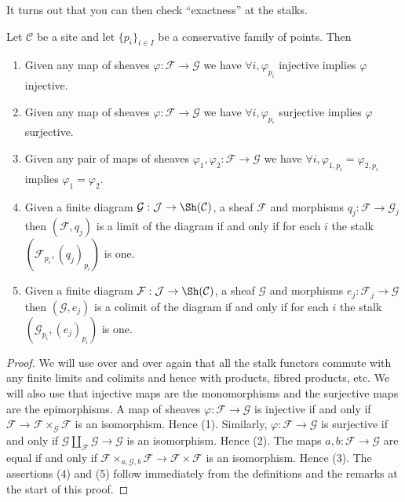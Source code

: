 \noindent
It turns out that you can then check ``exactness'' at the stalks.

\begin{lemma}
\label{lemma-exactness-stalks}
Let $\mathcal{C}$ be a site and let $\{p_i\}_{i\in I}$ be a conservative
family of points. Then
\begin{enumerate}
\item Given any map of sheaves $\varphi : \mathcal{F} \to \mathcal{G}$
we have $\forall i, \varphi_{p_i}$ injective implies $\varphi$ injective.
\item Given any map of sheaves $\varphi : \mathcal{F} \to \mathcal{G}$
we have $\forall i, \varphi_{p_i}$ surjective implies $\varphi$ surjective.
\item Given any pair of maps of sheaves
$\varphi_1, \varphi_2 : \mathcal{F} \to \mathcal{G}$
we have $\forall i, \varphi_{1, p_i} = \varphi_{2, p_i}$
implies $\varphi_1 = \varphi_2$.
\item Given a finite diagram $\mathcal{G} : \mathcal{J}
\to \Sh(\mathcal{C})$, a sheaf $\mathcal{F}$ and morphisms
$q_j : \mathcal{F} \to \mathcal{G}_j$ then $(\mathcal{F}, q_j)$
is a limit of the diagram if and only if for each $i$ the stalk
$(\mathcal{F}_{p_i}, (q_j)_{p_i})$ is one.
\item Given a finite diagram $\mathcal{F} : \mathcal{J}
\to \Sh(\mathcal{C})$, a sheaf $\mathcal{G}$ and morphisms
$e_j : \mathcal{F}_j \to \mathcal{G}$ then $(\mathcal{G}, e_j)$
is a colimit of the diagram if and only if for each $i$ the stalk
$(\mathcal{G}_{p_i}, (e_j)_{p_i})$ is one.
\end{enumerate}
\end{lemma}

\begin{proof}
We will use over and over again that all the stalk functors commute
with any finite limits and colimits and hence with products, fibred
products, etc. We will also use that injective maps are the monomorphisms
and the surjective maps are the epimorphisms.
A map of sheaves $\varphi : \mathcal{F} \to \mathcal{G}$
is injective if and only if
$\mathcal{F} \to \mathcal{F} \times_\mathcal{G}\mathcal{F}$
is an isomorphism. Hence (1).
Similarly, $\varphi : \mathcal{F} \to \mathcal{G}$
is surjective if and only if
$\mathcal{G} \amalg_\mathcal{F} \mathcal{G} \to \mathcal{G}$
is an isomorphism. Hence (2).
The maps $a, b : \mathcal{F} \to \mathcal{G}$
are equal if and only if $\mathcal{F} \times_{a, \mathcal{G}, b}\mathcal{F}
\to \mathcal{F} \times \mathcal{F}$ is an isomorphism. Hence (3).
The assertions (4) and (5) follow immediately from the definitions
and the remarks at the start of this proof.
\end{proof}

